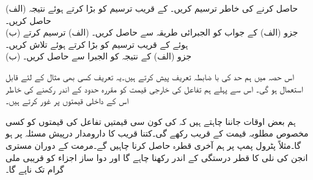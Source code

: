 
(الف)\quad
{} حاصل کرنے کی خاطر  ترسیم کریں۔  کے قریب ترسیم کو بڑا کرتے ہوئے نتیجہ حاصل کریں۔\\
(ب)\quad
جزو (الف) کے جواب کو الجبرائی طریقہ سے حاصل کریں۔ 
(الف)\quad
{} ترسیم کرتے ہوئے  کے قریب ترسیم کو بڑا کرتے ہوئے  تلاش کریں۔ \\
(ب)\quad
جزو (الف) کے نتیجہ کو الجبرا سے حاصل کریں۔

اس حصہ میں ہم حد کی با ضابطہ تعریف پیش کرتے ہیں۔یہ تعریف کسی بھی مثال کے لئے قابل استعمال ہو گی۔ اس سے پہلے ہم تفاعل کی خارجی قیمت کو مقررہ حدود کے اندر رکھنے کی خاطر اس کے داخلی قیمتوں پر غور کرتے ہیں۔

ہم بعض اوقات جاننا چاہتے ہیں کہ  کی کون سی قیمتیں  تفاعل  کی قیمتوں کو کسی مخصوص مطلوبہ قیمت کے قریب رکھے گی۔کتنا قریب کا دارومدار درپیش مسئلہ پر ہو گا۔مثلاً پٹرول پمپ پر ہم آخری قطرہ حاصل کرنا چاہیں گے۔مرمت کے دوران  مستری انجن  کی  نلی کا قطر  درستگی کے اندر رکھنا چاہے گا اور دوا ساز اجزاء کو قریبی ملی گرام تک ناپے گا۔

